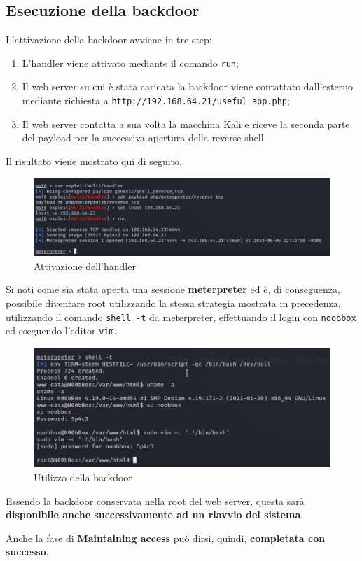 \documentclass[a4paper, 12pt, oneside]{article}
\begin{document}
\subsection{Esecuzione della backdoor}

L'attivazione della backdoor avviene in tre step:

\begin{enumerate}
    \item L'handler viene attivato mediante il comando \texttt{run};
    \item Il web server su cui è stata caricata la backdoor viene contattato dall'esterno mediante richiesta a \texttt{http://192.168.64.21/useful\_app.php};
    \item Il web server contatta a sua volta la macchina Kali e riceve la seconda parte del payload per la successiva apertura della reverse shell.
\end{enumerate}

Il risultato viene mostrato qui di seguito.

\begin{figure}[h!]
    \centering
    \includegraphics[width=\textwidth]{img/handler.png}
    \caption{Attivazione dell'handler}
\end{figure}

Si noti come sia stata aperta una sessione \textbf{meterpreter} ed è, di conseguenza, possibile diventare root utilizzando la stessa strategia mostrata in precedenza, utilizzando il comando \texttt{shell -t} da meterpreter, effettuando il login con \texttt{noobbox} ed eseguendo l'editor \texttt{vim}.

\newpage
\begin{figure}[h!]
    \centering
    \includegraphics[width=\textwidth]{img/backdoor_root.png}
    \caption{Utilizzo della backdoor}
\end{figure}

Essendo la backdoor conservata nella root del web server, questa sarà \textbf{disponibile anche successivamente ad un riavvio del sistema}.

Anche la fase di \textbf{Maintaining access} può dirsi, quindi, \textbf{completata con successo}.

\newpage
\printbibliography[title={Riferimenti bibliografici e risorse consultate}]
\end{document}
